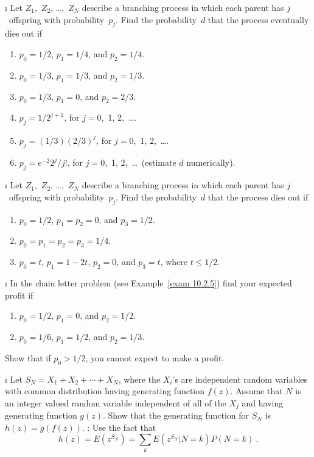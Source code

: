 \exercises
\begin{LJSItem}

\i\label{exer 10.2.1} Let $Z_1$,~$Z_2$, \ldots,~$Z_N$ describe a branching process in 
which each parent has $j$~offspring with probability~$p_j$.  Find the probability~$d$ 
that the process eventually dies out if
\begin{enumerate}
\item $p_0 = 1/2$, $p_1 = 1/4$, and $p_2 = 1/4$.

\item $p_0 = 1/3$, $p_1 = 1/3$, and $p_2 = 1/3$.

\item $p_0 = 1/3$, $p_1 = 0$, and $p_2 = 2/3$.

\item $p_j = 1/2^{j + 1}$, for $j = 0$,~1, 2,~\ldots.

\item $p_j = (1/3)(2/3)^j$, for $j = 0$,~1, 2,~\ldots.

\item $p_j = e^{-2} 2^j/j!$, for $j = 0$,~1, 2,~\ldots\ (estimate $d$
numerically).
\end{enumerate}

\i\label{exer 10.2.2} Let $Z_1$,~$Z_2$, \ldots,~$Z_N$ describe a branching process in 
which each parent has $j$~offspring with probability~$p_j$.  Find the probability~$d$ that
the process dies out if
\begin{enumerate}
\item $p_0 = 1/2$, $p_1 = p_2 = 0$, and $p_3 = 1/2$.

\item $p_0 = p_1 = p_2 = p_3 = 1/4$.

\item $p_0 = t$, $p_1 = 1 - 2t$, $p_2 = 0$, and $p_3 = t$, where $t \leq
1/2$.
\end{enumerate}

\i\label{exer 10.2.3} In the chain letter problem (see Example~\ref{exam 10.2.5}) find 
your expected profit if
\begin{enumerate}
\item $p_0 = 1/2$, $p_1 = 0$, and $p_2 = 1/2$.

\item $p_0 = 1/6$, $p_1 = 1/2$, and $p_2 = 1/3$.
\end{enumerate}
Show that if $p_0 > 1/2$, you cannot expect to make a profit.

\i\label{exer 10.2.4} Let $S_N = X_1 + X_2 +\cdots+ X_N$, where the $X_i$'s are independent random
variables with common distribution having generating function $f(z)$.  Assume that $N$ is an integer
valued random variable independent of all of the $X_j$ and having generating function $g(z)$. 
Show that the generating function for $S_N$ is $h(z) = g(f(z))$.  :
Use the fact that
$$
h(z) = E(z^{S_N}) = \sum_k E(z^{S_N} | N = k) P(N = k)\ .
$$


\end{LJSItem}
